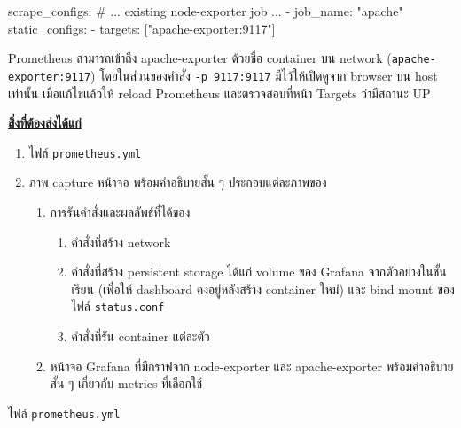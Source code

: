 \documentclass[a4paper, 10pt]{article}
\begin{document}
\begin{codingbox}[language=yaml]
scrape_configs:
 # ... existing node-exporter job ...
 - job_name: "apache"
 static_configs:
 - targets: ["apache-exporter:9117"]
\end{codingbox}

\par\noindent Prometheus \textthai{สามารถเข้าถึง} apache-exporter
\textthai{ด้วยชื่อ} container \textthai{บน} network (\texttt{apache-exporter:9117})
\textthai{โดยในส่วนของคำสั่ง} \texttt{-p 9117:9117} \textthai{มีไว้ให้เปิดดูจาก}
browser \textthai{บน} host \textthai{เท่านั้น เมื่อแก้ไขแล้วให้} reload Prometheus
\textthai{และตรวจสอบที่หน้า} Targets \textthai{ว่ามีสถานะ} UP

\myspace

\par\noindent \underline{\textbf{\textthai{สิ่งที่ต้องส่งได้แก่}}}
\begin{enumerate}[label=\arabic*.]
	\item \textthai{ไฟล์} \texttt{prometheus.yml}
	\item \textthai{ภาพ} capture \textthai{หน้าจอ พร้อมคำอธิบายสั้น ๆ ประกอบแต่ละภาพของ}
	      \begin{enumerate}[label=\arabic*.]
		      \item \textthai{การรันคำสั่งและผลลัพธ์ที่ได้ของ}
		            \begin{enumerate}[label=\arabic*.]
			            \item \textthai{คำสั่งที่สร้าง} network
			            \item \textthai{คำสั่งที่สร้าง} persistent storage \textthai{ได้แก่} volume \textthai{ของ} Grafana \textthai{จากตัวอย่างในชั้นเรียน}
			                  (\textthai{เพื่อให้} dashboard \textthai{คงอยู่หลังสร้าง} container \textthai{ใหม่})
			                  \textthai{และ} bind mount \textthai{ของไฟล์} \texttt{status.conf}
			            \item \textthai{คำสั่งที่รัน} container \textthai{แต่ละตัว}
		            \end{enumerate}
		      \item \textthai{หน้าจอ} Grafana \textthai{ที่มีกราฟจาก} node-exporter
		            \textthai{และ} apache-exporter \textthai{พร้อมคำอธิบายสั้น ๆ เกี่ยวกับ} metrics \textthai{ที่เลือกใช้}
	      \end{enumerate}

\end{enumerate}

\begin{problem}
\textthai{ไฟล์} \texttt{prometheus.yml}
\end{problem}
\end{document}
